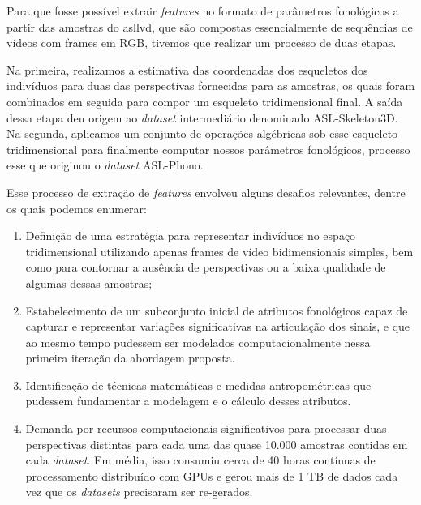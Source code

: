 Para que fosse possível extrair \textit{features} no formato de parâmetros fonológicos a partir das amostras do \acrshort{asllvd}, que são compostas essencialmente de sequências de vídeos com frames em RGB, tivemos que realizar um processo de duas etapas.

Na primeira, realizamos a estimativa das coordenadas dos esqueletos dos indivíduos para duas das perspectivas fornecidas para as amostras, os quais foram combinados em seguida para compor um esqueleto tridimensional final. A saída dessa etapa deu origem ao \textit{dataset} intermediário denominado ASL-Skeleton3D.
Na segunda, aplicamos um conjunto de operações algébricas sob esse esqueleto tridimensional para finalmente computar nossos parâmetros fonológicos, processo esse que originou o \textit{dataset} ASL-Phono.


Esse processo de extração de \textit{features} envolveu alguns desafios relevantes, dentre os quais podemos enumerar:

\begin{enumerate}
    \item Definição de uma estratégia para representar indivíduos no espaço tridimensional utilizando apenas frames de vídeo bidimensionais simples, bem como para contornar a ausência de perspectivas ou a baixa qualidade de algumas dessas amostras;

    \item Estabelecimento de um subconjunto inicial de atributos fonológicos capaz de capturar e representar variações significativas na articulação dos sinais, e que ao mesmo tempo pudessem ser modelados computacionalmente nessa primeira iteração da abordagem proposta.

    \item Identificação de técnicas matemáticas e medidas antropométricas que pudessem fundamentar a modelagem e o cálculo desses atributos.

    \item Demanda por recursos computacionais significativos para processar duas perspectivas distintas para cada uma das quase 10.000 amostras contidas em cada \textit{dataset}. Em média, isso consumiu cerca de 40 horas contínuas de processamento distribuído com GPUs e gerou mais de 1 TB de dados cada vez que os \textit{datasets} precisaram ser re-gerados.
\end{enumerate}





